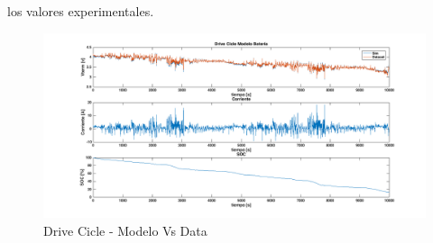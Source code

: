 \documentclass[10pt]{beamer}
\theoremstyle{remark}
\theoremstyle{definition}
\begin{document}
\begin{frame}[allowframebreaks]
  	los valores experimentales.
  	\begin{figure}[!hb]
		\centering
		\includegraphics[width=0.9\linewidth]{images/Drive_Cicle_Modelo_Bateria.png}
		\caption{Drive Cicle - Modelo Vs Data}
		\label{fig:DC_modVsData}
  	\end{figure}
\end{frame}
\end{document}
